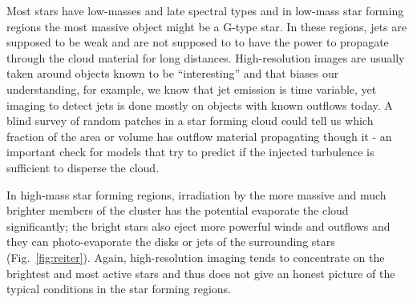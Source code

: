 \documentclass[12pt]{article}
\begin{document}
Most stars have low-masses and late spectral types and in low-mass star forming regions the most massive object might be a G-type star. In these regions, jets are supposed to be weak and are not supposed to to have the power to propagate through the cloud material for long distances. High-resolution images are usually taken around objects known to be ``interesting'' and that biases our understanding, for example, we know that jet emission is time variable, yet imaging to detect jets is done mostly on objects with known outflows today. A blind survey of random patches in a star forming cloud could tell us which fraction of the area or volume has outflow material propagating though it - an important check for models that try to predict if the injected turbulence is sufficient to disperse the cloud.

In high-mass star forming regions, irradiation by the more massive and much brighter members of the cluster has the potential evaporate the cloud significantly; the bright stars also eject more powerful winds and outflows and they can photo-evaporate the disks or jets of the surrounding stars (Fig.~\ref{fig:reiter}). Again, high-resolution imaging tends to concentrate on the brightest and most active stars and thus does not give an honest picture of the typical conditions in the star forming regions.
\end{document}
